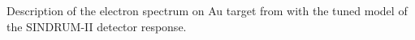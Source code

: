 \vspace{0.2in}
%
 {
  \label{fig:ana_step1_best_dio_fit}
  Description of the electron spectrum on Au target from \cite{sindrum_ii_Bertl2006}
  with the tuned model of the SINDRUM-II detector response.
}
